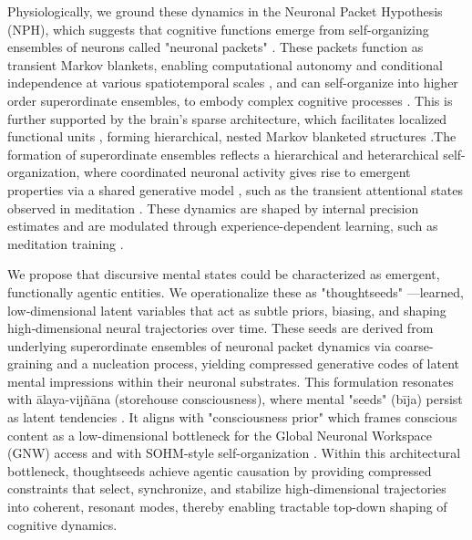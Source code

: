 \documentclass[openacc]{rsproca_new}%
\begin{document}
Physiologically, we ground these dynamics in the Neuronal Packet Hypothesis (NPH), which suggests that cognitive functions emerge from self-organizing ensembles of neurons called "neuronal packets" \cite{Yufik2019,YufikFriston2016,Ramstead2021}. These packets function as transient Markov blankets, enabling computational autonomy and conditional independence at various spatiotemporal scales \cite{Kirchhoff2018}, and can self-organize into higher order superordinate ensembles, to embody complex cognitive processes \cite{Ramstead2021}. This is further supported by the brain’s sparse architecture, which facilitates localized functional units \cite{SpornsBetzel2016}, forming hierarchical, nested Markov blanketed structures \cite{Hipolito2021}.The formation of superordinate ensembles reflects a hierarchical and heterarchical self-organization, where coordinated neuronal activity gives rise to emergent properties via a shared generative model \cite{Ramstead2021,Ramstead2022,Palacios2020}, such as the transient attentional states observed in meditation \cite{Hasenkamp2012}. These dynamics are shaped by internal precision estimates and are modulated through experience-dependent learning, such as meditation training \cite{Czajko2024,Hohwy2013,Varela2017}. 

We propose that discursive mental states could be characterized as emergent, functionally agentic entities. We operationalize these as "thoughtseeds" \cite{Kavi2025}—learned, low‑dimensional latent variables that act as subtle priors, biasing, and shaping high‑dimensional neural trajectories over time. These seeds are derived from underlying superordinate ensembles of neuronal packet dynamics \cite{Ramstead2021} via coarse-graining and a nucleation process, yielding compressed generative codes of latent mental impressions within their neuronal substrates. This formulation resonates with ālaya-vijñāna (storehouse consciousness), where mental "seeds" (bīja) persist as latent tendencies \cite{Analayo2019}. It aligns with "consciousness prior" which frames conscious content as a low-dimensional bottleneck \cite{Bengio2017} for the Global Neuronal Workspace (GNW) access \cite{Mashour2020,DehaeneChangeux2011} and with SOHM-style self-organization \cite{Safron2020}. Within this architectural bottleneck, thoughtseeds achieve agentic causation by providing compressed constraints that select, synchronize, and stabilize high-dimensional trajectories into coherent, resonant modes, thereby enabling tractable top-down shaping of cognitive dynamics.
\end{document}
